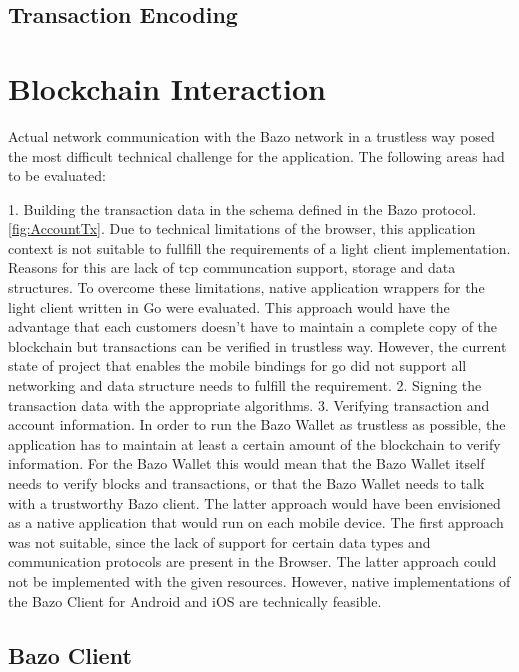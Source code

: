 \subsection{Transaction Encoding}

\section{Blockchain Interaction}
Actual network communication with the Bazo network in a trustless way posed the most difficult technical challenge for the application. The following areas had to be evaluated:

1. Building the transaction data in the schema defined in the Bazo protocol. \ref{fig:AccountTx}.
Due to technical limitations of the browser, this application context is not suitable to fullfill the requirements of a light client implementation. Reasons for this are lack of tcp communcation support, storage and data structures.
To overcome these limitations, native application wrappers for the light client written in Go were evaluated. This approach would have the advantage that each customers doesn't have to maintain a complete copy of the blockchain but transactions can be verified in trustless way. However, the current state of project that enables the mobile bindings for go did not support all networking and data structure needs to fulfill the requirement. \cite{godocs}
2. Signing the transaction data with the appropriate algorithms.
3. Verifying transaction and account information.
In order to run the Bazo Wallet as trustless as possible, the application has to maintain at least a certain amount of the blockchain to verify information. For the Bazo Wallet this would mean that the Bazo Wallet itself needs to verify blocks and transactions, or that the Bazo Wallet needs to talk with a trustworthy Bazo client. The latter approach would have been envisioned as a native application that would run on each mobile device.
The first approach was not suitable, since the lack of support for certain data types and communication protocols are present in the Browser. The latter approach could not be implemented with the given resources. However, native implementations of the Bazo Client for Android and iOS are technically feasible.



\subsection{Bazo Client}

